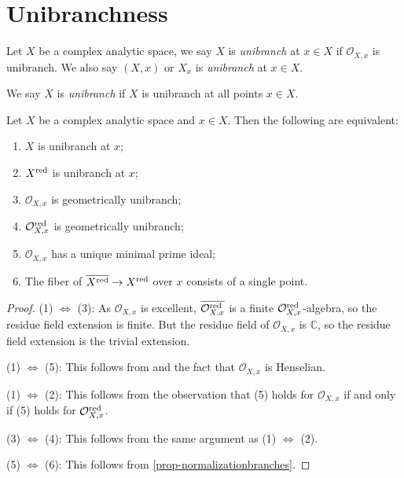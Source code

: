 \section{Unibranchness}
\begin{definition}
    Let $X$ be a complex analytic space, we say $X$ is \emph{unibranch} at $x\in X$ if $\mathcal{O}_{X,x}$ is unibranch. We also say $(X,x)$ or $X_x$ is \emph{unibranch} at $x\in X$.

    We say $X$ is \emph{unibranch} if $X$ is unibranch at all points $x\in X$. 
\end{definition}

\begin{proposition}\label{prop-unibranchchar}
    Let $X$ be a complex analytic space and $x\in X$. Then the following are equivalent:
    \begin{enumerate}
        \item $X$ is unibranch at $x$;
        \item $X^{\operatorname{red}}$ is unibranch at $x$;
        \item $\mathcal{O}_{X,x}$ is geometrically unibranch;
        \item $\mathcal{O}_{X,x}^{\operatorname{red}}$ is geometrically unibranch;
        \item $\mathcal{O}_{X,x}$ has a unique minimal prime ideal;
        \item The fiber of $\overline{X^{\operatorname{red}}}\rightarrow X^{\operatorname{red}}$ over $x$ consists of a single point.
    \end{enumerate}
\end{proposition}
\begin{proof}
    (1) $\Leftrightarrow$ (3): As $\mathcal{O}_{X,x}$ is excellent, $\overline{\mathcal{O}_{X,x}^{\operatorname{red}}}$ is a finite $\mathcal{O}_{X,x}^{\operatorname{red}}$-algebra, so the residue field extension is finite. But the residue field of $\mathcal{O}_{X,x}$ is $\mathbb{C}$, so the residue field extension is the trivial extension.

    (1) $\Leftrightarrow$ (5): This follows from \cite[\href{https://stacks.math.columbia.edu/tag/0BQ0}{Tag 0BQ0}]{stacks-project} and the fact that $\mathcal{O}_{X,x}$ is Henselian.

    (1) $\Leftrightarrow$ (2): This follows from the observation that (5) holds for $\mathcal{O}_{X,x}$ if and only if (5) holds for $\mathcal{O}_{X,x}^{\operatorname{red}}$. 

    (3) $\Leftrightarrow$ (4): This follows from the same argument as (1) $\Leftrightarrow$ (2).

    (5) $\Leftrightarrow$ (6): This follows from \cref{prop-normalizationbranches}.
\end{proof}

